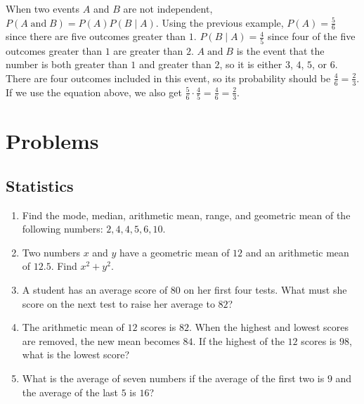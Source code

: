\documentclass[twocolumn]{article}
\newcommand{\pand}{\mathop\text{and}}
\begin{document}
When two events $A$ and $B$ are not independent, $P(A \pand B) = P(A)P(B \mid 
A)$. Using the previous example, $P(A) = \frac{5}{6}$ since there are five 
outcomes greater than $1$. $P(B \mid A) = \frac{4}{5}$ since four of the five 
outcomes greater than $1$ are greater than $2$. $A \pand B$ is the event that 
the number is both greater than $1$ and greater than $2$, so it is either $3$, 
$4$, $5$, or $6$. There are four outcomes included in this event, so its 
probability should be $\frac{4}{6} = \frac{2}{3}$. If we use the equation above, 
we also get $\frac{5}{6} \cdot \frac{4}{5} = \frac{4}{6} = \frac{2}{3}$.

\section*{Problems}

\subsection*{Statistics}
\begin{enumerate}
	\item Find the mode, median, arithmetic mean, range, and geometric mean
		of the following numbers: $2, 4, 4, 5, 6, 10$.
		\vspace{3cm}
	\item Two numbers $x$ and $y$ have a geometric mean of $12$ and an
		arithmetic mean of $12.5$. Find $x^2 + y^2$.
		\vspace{3cm}
	\item A student has an average score of $80$ on her first four tests.
		What must she score on the next test to raise her average to $82$?
		\vspace{3cm}
	\item The arithmetic mean of $12$ scores is $82$. When the highest and
		lowest scores are removed, the new mean becomes $84$. If the highest
		of the $12$ scores is $98$, what is the lowest score?
		\vspace{3cm}
	\item What is the average of seven numbers if the average of the first
		two is $9$ and the average of the last $5$ is $16$?
		\vspace{3cm}
\end{enumerate}
\end{document}
